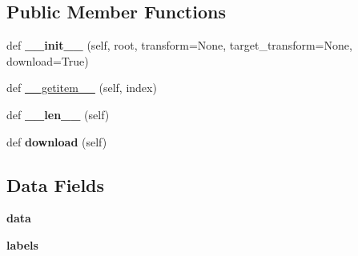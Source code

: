 \subsection*{Public Member Functions}
\begin{DoxyCompactItemize}
\item 
\mbox{\label{classtorchvision_1_1datasets_1_1semeion_1_1SEMEION_aa6b89c98442b649cab7c0fd3e2fd66c0}} 
def {\bfseries \+\_\+\+\_\+init\+\_\+\+\_\+} (self, root, transform=None, target\+\_\+transform=None, download=True)
\item 
def \hyperlink{classtorchvision_1_1datasets_1_1semeion_1_1SEMEION_ae6317c79301f796102c2c7fa96c96b3f}{\+\_\+\+\_\+getitem\+\_\+\+\_\+} (self, index)
\item 
\mbox{\label{classtorchvision_1_1datasets_1_1semeion_1_1SEMEION_a8546b33dc13b56b7e9de21eed0c91f07}} 
def {\bfseries \+\_\+\+\_\+len\+\_\+\+\_\+} (self)
\item 
\mbox{\label{classtorchvision_1_1datasets_1_1semeion_1_1SEMEION_ac425a3085cf7c3070fd1b2a38ae1b82c}} 
def {\bfseries download} (self)
\end{DoxyCompactItemize}
\subsection*{Data Fields}
\begin{DoxyCompactItemize}
\item 
\mbox{\label{classtorchvision_1_1datasets_1_1semeion_1_1SEMEION_a164d2de9c7053fbcb03a9138a7f44f2f}} 
{\bfseries data}
\item 
\mbox{\label{classtorchvision_1_1datasets_1_1semeion_1_1SEMEION_a1ce383189daeff759901433dbbfd3a16}} 
{\bfseries labels}
\end{DoxyCompactItemize}
